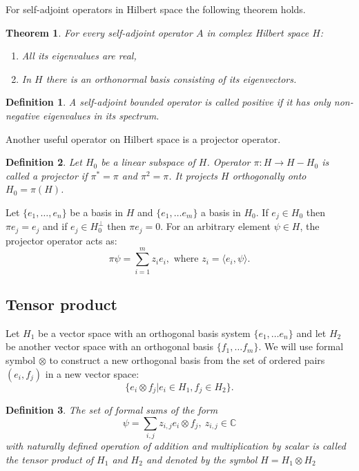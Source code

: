 \documentclass[11pt]{article}
\newtheorem{theorem}{Theorem}[section]
\newtheorem{definition}{Definition}[section]
\begin{document}
For self-adjoint operators in Hilbert space the following theorem holds.
\begin{theorem}
For every self-adjoint operator $A$ in complex Hilbert space $H$:
\begin{enumerate}
\item All its eigenvalues are real,
\item In $H$ there is an orthonormal basis consisting of its eigenvectors.
\end{enumerate}
\end{theorem}

\begin{definition}
A self-adjoint bounded operator is called positive if it has only non-negative eigenvalues in its spectrum.
\end{definition}

Another useful operator on Hilbert space is a projector operator.
\begin{definition}
Let $H_0$ be a linear subspace of $H$. Operator $\pi: H \to H - H_0$ is called a projector if $\pi^* = \pi$ and $\pi^2 = \pi$. It projects $H$ orthogonally onto $H_0 = \pi(H)$.
\end{definition}
Let $\{e_1, \ldots, e_n\}$ be a basis in $H$ and $\{e_1, \ldots e_m\}$ a basis in $H_0$. If $e_j \in H_0$ then $\pi e_j = e_j$ and if $e_j\in H_0^\perp$ then $\pi e_j = 0$. For an arbitrary element $\psi\in H$, the projector operator acts as: 
\[
\pi\psi = \sum_{i = 1}^m z_ie_i, \mbox{ where } z_i = \langle e_i, \psi\rangle.
\]

\subsection{Tensor product}
Let $H_1$ be a vector space with an orthogonal basis system $\{e_1, \ldots e_n\}$ and let $H_2$ be another vector space with an orthogonal basis $\{f_1,\ldots f_m\}$. We will use formal symbol $\otimes$ to construct a new orthogonal basis from the set of ordered pairs $(e_i, f_j)$ in a new vector space:
\begin{equation}
\{e_i \otimes f_j | e_i \in H_1, f_j \in H_2\}. \label{eq:tensor_basis}
\end{equation}

\begin{definition}
The set of formal sums of the form
\begin{equation}
\psi = \sum_{i,j}z_{i,j}e_i\otimes f_j,\ z_{i,j} \in \mathbb{C}
\label{eq:tensor_element}
\end{equation}
with naturally defined operation of addition and multiplication by scalar is called the tensor product of $H_1$ and $H_2$ and denoted by the symbol $H = H_1\otimes H_2$
\end{definition}
\end{document}

